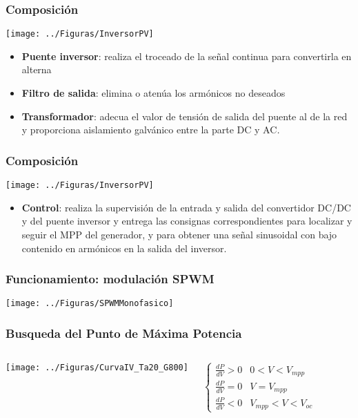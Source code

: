 \documentclass[serif, xcolor=dvipsnames]{beamer}
\begin{document}
\begin{frame}[plain]
  \frametitle{Composición}

  \begin{center}
    \texttt{[image: ../Figuras/InversorPV]}
    \par\end{center}
  \begin{itemize}
  \item \textbf{Puente inversor}:\emph{ }realiza el troceado de la
    señal continua para convertirla en alterna
  \item \textbf{Filtro de salida}: elimina o atenúa los armónicos no
    deseados
  \item \textbf{Transformador}: adecua el valor de tensión de salida
    del puente al de la red y proporciona aislamiento galvánico entre
    la parte DC y AC\emph{. }
  \end{itemize}

\end{frame}
\begin{frame}[plain]
  \frametitle{Composición}

  \begin{center}
    \texttt{[image: ../Figuras/InversorPV]}
    \par\end{center}
  \begin{itemize}
  \item \textbf{Control}: realiza la supervisión de la entrada y
    salida del convertidor DC/DC y del puente inversor y entrega las
    consignas correspondientes para localizar y seguir el MPP del
    generador, y para obtener una señal sinusoidal con bajo contenido
    en armónicos en la salida del inversor.
  \end{itemize}

\end{frame}
\begin{frame}[plain]
  \frametitle{Funcionamiento: modulación SPWM}

  \begin{center}
    \texttt{[image: ../Figuras/SPWMMonofasico]}
    \par\end{center}


\end{frame}
\begin{frame}
  \frametitle{Busqueda del Punto de Máxima Potencia}
  \begin{columns}[c]%


    \column{6cm}

    \texttt{[image: ../Figuras/CurvaIV\_Ta20\_G800]}


    \column{6cm}

    \[
    \begin{cases}
      \frac{dP}{dV}>0 & 0<V<V_{mpp}\\
      \frac{dP}{dV}=0 & V=V_{mpp}\\
      \frac{dP}{dV}<0 & V_{mpp}<V<V_{oc}\end{cases}\]


  \end{columns}%

\end{frame}
\end{document}
